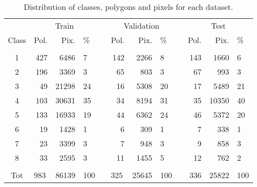 \begin{table}[H]
  \begin{tabular}{crrlcrrlcrrl}
     \cline{2-4} \cline{6-8} \cline{10-12} \\[-0.2cm]
          & \multicolumn{3}{c}{Train}                                 & \multicolumn{1}{l}{} & \multicolumn{3}{c}{Validation}                            & \multicolumn{1}{c}{} & \multicolumn{3}{c}{Test} \\[0.1cm]
    Class & Pol.                    & Pix.                      & \%  &                      & Pol.                    & Pix.  & \%                      &                      & Pol.   & Pix.    & \%    \\[0.2cm] \cline{2-4} \cline{6-8} \cline{10-12} \\[-0.2cm]
    1     & 427                     & 6486                      & 7   &                      & 142                     & 2266  & 8                       &                      & 143    & 1660    & 6     \\
    2     & 196                     & 3369                      & 3   &                      & 65                      & 803   & 3                       &                      & 67     & 993     & 3     \\
    3     & 49                      & 21298                     & 24  &                      & 16                      & 5308  & 20                      &                      & 17     & 5489    & 21    \\
    4     & 103                     & 30631                     & 35  &                      & 34                      & 8194  & 31                      &                      & 35     & 10350   & 40    \\
    5     & 133                     & 16933                     & 19  &                      & 44                      & 6362  & 24                      &                      & 46     & 5372    & 20    \\
    6     & 19                      & 1428                      & 1   &                      & 6                       & 309   & 1                       &                      & 7      & 338     & 1     \\
    7     & 23                      & 3399                      & 3   &                      & 7                       & 948   & 3                       &                      & 9      & 858     & 3     \\
    8     & 33                      & 2595                      & 3   &                      & 11                      & 1455  & 5                       &                      & 12     & 762     & 2     \\[0.2cm]\hline \\[-0.2cm]
    Tot   & \multicolumn{1}{l}{983} & \multicolumn{1}{l}{86139} & 100 & \multicolumn{1}{l}{} & \multicolumn{1}{l}{325} & 25645 & \multicolumn{1}{l}{100} & \multicolumn{1}{l}{} & 336    & 25822   & 100       
  \end{tabular}
  \caption{Distribution of classes, polygons and pixels for each dataset.}
  \label{tab:dataset-splits}
\end{table}


